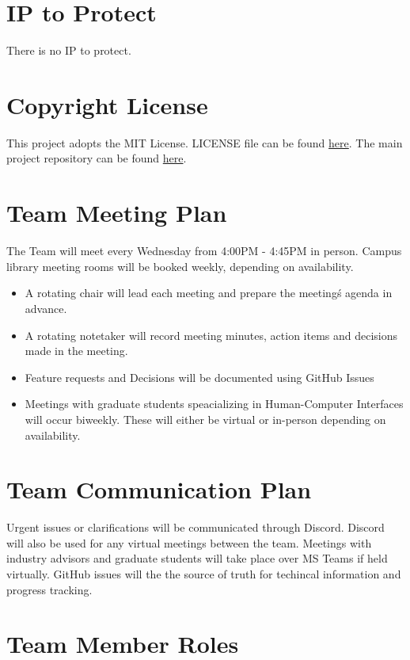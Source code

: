 \documentclass{article}
\begin{document}
\section{IP to Protect}

There is no IP to protect.

\section{Copyright License}

This project adopts the MIT License. LICENSE file can be found \href{https://github.com/gkpodder/Capstone/blob/main/LICENSE}
{here}. The main project repository can be found \href{https://github.com/gkpodder/Proxi}{here}.

\section{Team Meeting Plan}
The Team will meet every Wednesday from 4:00PM - 4:45PM in person. Campus library meeting rooms will be booked weekly, depending on availability.
\begin{itemize}
  \item A rotating chair will lead each meeting and prepare the meeting\'s agenda in advance.
  \item A rotating notetaker will record meeting minutes, action items and decisions made in the meeting.
  \item Feature requests and Decisions will be documented using GitHub Issues
  \item Meetings with graduate students speacializing in Human-Computer Interfaces will occur biweekly. These will either be virtual or in-person depending on availability.
\end{itemize}

\section{Team Communication Plan}

Urgent issues or clarifications will be communicated through Discord. Discord will also be used for any virtual meetings between the team. 
Meetings with industry advisors and graduate students will take place over MS Teams if held virtually. 
GitHub issues will the the source of truth for techincal information and progress tracking.

\section{Team Member Roles}
\end{document}
